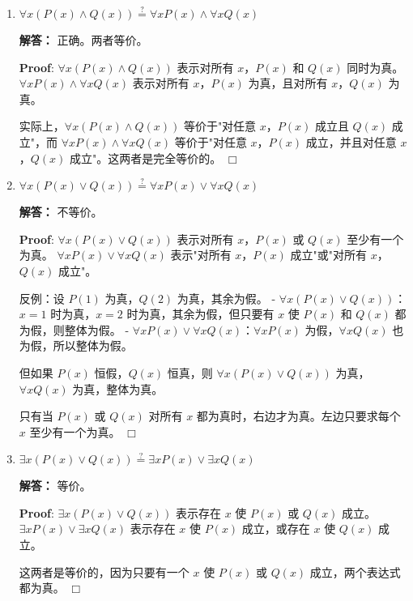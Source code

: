 \documentclass[11pt]{article}
\newenvironment{qparts}{\begin{enumerate}[{(}a{)}]}{\end{enumerate}}
\def\endproofmark{$\Box$}
\newenvironment{proof}{\par{\bf Proof}:}{\endproofmark\smallskip}
\begin{document}
\begin{qparts}
\item $\forall x (P(x) \wedge Q(x)) \stackrel{?}{=} \forall x P(x) \wedge \forall x Q(x)$

\textbf{解答：} 正确。两者等价。\par
\begin{proof}
$\forall x (P(x) \wedge Q(x))$ 表示对所有 $x$，$P(x)$ 和 $Q(x)$ 同时为真。
$\forall x P(x) \wedge \forall x Q(x)$ 表示对所有 $x$，$P(x)$ 为真，且对所有 $x$，$Q(x)$ 为真。

实际上，$\forall x (P(x) \wedge Q(x))$ 等价于"对任意 $x$，$P(x)$ 成立且 $Q(x)$ 成立"，而 $\forall x P(x) \wedge \forall x Q(x)$ 等价于"对任意 $x$，$P(x)$ 成立，并且对任意 $x$，$Q(x)$ 成立"。这两者是完全等价的。
\end{proof}

\item $\forall x (P(x) \vee Q(x)) \stackrel{?}{=} \forall x P(x) \vee \forall x Q(x)$

\textbf{解答：} 不等价。\par
\begin{proof}
$\forall x (P(x) \vee Q(x))$ 表示对所有 $x$，$P(x)$ 或 $Q(x)$ 至少有一个为真。
$\forall x P(x) \vee \forall x Q(x)$ 表示"对所有 $x$，$P(x)$ 成立"或"对所有 $x$，$Q(x)$ 成立"。

反例：设 $P(1)$ 为真，$Q(2)$ 为真，其余为假。
- $\forall x (P(x) \vee Q(x))$：$x=1$ 时为真，$x=2$ 时为真，其余为假，但只要有 $x$ 使 $P(x)$ 和 $Q(x)$ 都为假，则整体为假。
- $\forall x P(x) \vee \forall x Q(x)$：$\forall x P(x)$ 为假，$\forall x Q(x)$ 也为假，所以整体为假。

但如果 $P(x)$ 恒假，$Q(x)$ 恒真，则 $\forall x (P(x) \vee Q(x))$ 为真，$\forall x Q(x)$ 为真，整体为真。

只有当 $P(x)$ 或 $Q(x)$ 对所有 $x$ 都为真时，右边才为真。左边只要求每个 $x$ 至少有一个为真。
\end{proof}

\item $\exists x (P(x) \vee Q(x)) \stackrel{?}{=} \exists x P(x) \vee \exists x Q(x)$

\textbf{解答：} 等价。\par
\begin{proof}
$\exists x (P(x) \vee Q(x))$ 表示存在 $x$ 使 $P(x)$ 或 $Q(x)$ 成立。
$\exists x P(x) \vee \exists x Q(x)$ 表示存在 $x$ 使 $P(x)$ 成立，或存在 $x$ 使 $Q(x)$ 成立。

这两者是等价的，因为只要有一个 $x$ 使 $P(x)$ 或 $Q(x)$ 成立，两个表达式都为真。
\end{proof}


\end{qparts}
\end{document}
